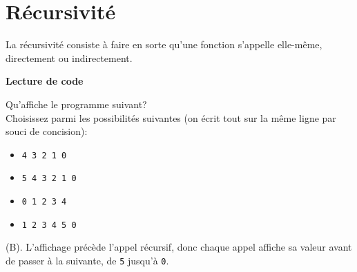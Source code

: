  
     \section{Récursivité}
    
    La récursivité consiste à faire en sorte qu'une fonction s'appelle elle-même, directement ou indirectement. \\
    
\begin{Exercice}[5 minutes] [Python] \textbf{Lecture de code} 
	
	Qu'affiche le programme suivant? \\ 
	
	
	
	Choisissez parmi les possibilités suivantes (on écrit tout sur la même ligne par souci de concision): \\
	
	\begin{itemize}
            \item[(A)] \texttt{4 3 2 1 0}
            \item[(B)] \texttt{5 4 3 2 1 0}
            \item[(C)] \texttt{0 1 2 3 4}
            \item[(D)] \texttt{1 2 3 4 5 0}
        \end{itemize}
    \begin{solution}
            (B). L'affichage précède l'appel récursif, donc chaque appel affiche sa valeur avant de passer à la suivante, de \texttt{5} jusqu'à \texttt{0}.
        \end{solution} 
    
\end{Exercice}

